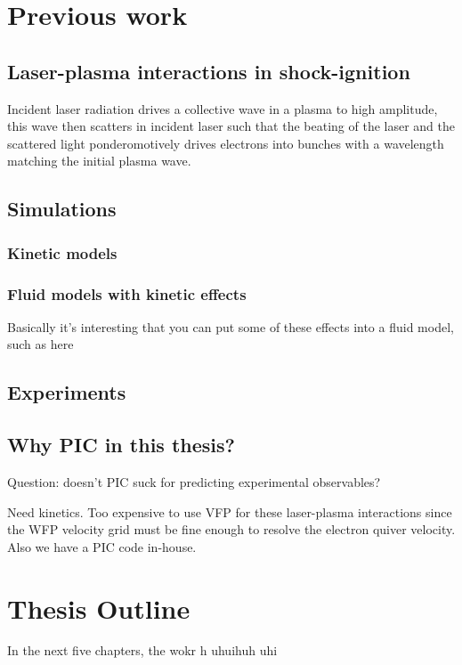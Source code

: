 \section{Previous work}
\subsection{Laser-plasma interactions in shock-ignition}

Incident laser radiation drives a collective wave in a plasma to high amplitude, this wave then scatters in incident laser such that the beating of the laser and the scattered light ponderomotively drives electrons into bunches with a wavelength matching the initial plasma wave.

\subsection{Simulations}
\subsubsection{Kinetic models}
\subsubsection{Fluid models with kinetic effects}
Basically it's interesting that you can put some of these effects into a fluid model, such as here \citep{Tran2020}
\subsection{Experiments}

\subsection{Why PIC in this thesis?}
Question: doesn't PIC suck for predicting experimental observables? 

Need kinetics. Too expensive to use VFP for these laser-plasma interactions since the WFP velocity grid must be fine enough to resolve the electron quiver velocity. Also we have a PIC code in-house.

\section{Thesis Outline}
In the next five chapters, the wokr h uhuihuh uhi 

